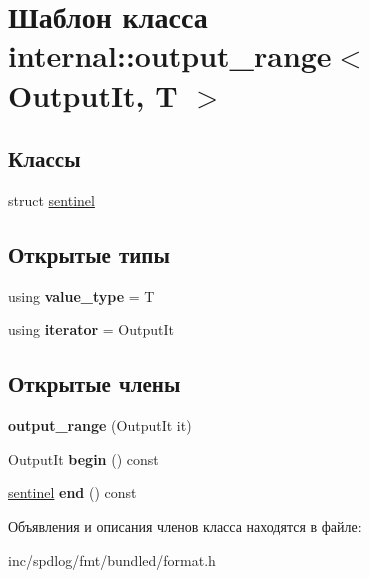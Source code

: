 \hypertarget{classinternal_1_1output__range}{}\section{Шаблон класса internal\+:\+:output\+\_\+range$<$ Output\+It, T $>$}
\label{classinternal_1_1output__range}
\subsection*{Классы}
\begin{DoxyCompactItemize}
\item 
struct \hyperlink{structinternal_1_1output__range_1_1sentinel}{sentinel}
\end{DoxyCompactItemize}
\subsection*{Открытые типы}
\begin{DoxyCompactItemize}
\item 
\mbox{\label{classinternal_1_1output__range_abe29001587e688fdc52a6344c74ce2a4}} 
using {\bfseries value\+\_\+type} = T
\item 
\mbox{\label{classinternal_1_1output__range_af22689fba10a879ac505cb36f64d5cf4}} 
using {\bfseries iterator} = Output\+It
\end{DoxyCompactItemize}
\subsection*{Открытые члены}
\begin{DoxyCompactItemize}
\item 
\mbox{\label{classinternal_1_1output__range_a78861512fd63f4d20e083eb16974bf8e}} 
{\bfseries output\+\_\+range} (Output\+It it)
\item 
\mbox{\label{classinternal_1_1output__range_a8be86f975b09a97c663465ccc8db179e}} 
Output\+It {\bfseries begin} () const
\item 
\mbox{\label{classinternal_1_1output__range_a55114af08beeb342549259b439b998f2}} 
\hyperlink{structinternal_1_1output__range_1_1sentinel}{sentinel} {\bfseries end} () const
\end{DoxyCompactItemize}


Объявления и описания членов класса находятся в файле\+:\begin{DoxyCompactItemize}
\item 
inc/spdlog/fmt/bundled/format.\+h\end{DoxyCompactItemize}
